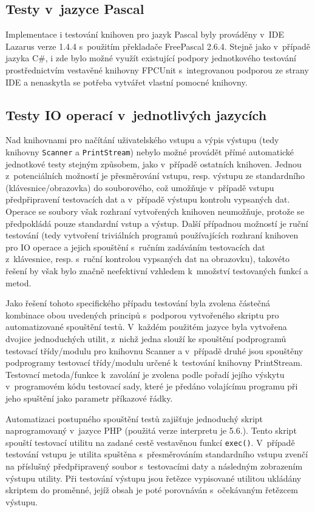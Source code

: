 \documentclass[czech,BP]{thesiskiv}
\begin{document}
\subsection{Testy v~jazyce Pascal}
Implementace i testování knihoven pro jazyk Pascal byly prováděny v~IDE Lazarus verze 1.4.4 s~použitím překladače FreePascal 2.6.4. Stejně jako v~případě jazyka C\#, i zde bylo možné využít existující podpory jednotkového testování prostřednictvím vestavěné knihovny FPCUnit s~integrovanou podporou ze strany IDE a nenaskytla se potřeba vytvářet vlastní pomocné knihovny.

\subsection{Testy IO operací v~jednotlivých jazycích}
Nad knihovnami pro načítání uživatelského vstupu a výpis výstupu (tedy knihovny \texttt{Scanner} a \texttt{PrintStream}) nebylo možné provádět přímé automatické jednotkové testy stejným způsobem, jako v~případě ostatních knihoven. Jednou z~potenciálních možností je přesměrování vstupu, resp. výstupu ze standardního (klávesnice/obrazovka) do souborového, což umožňuje v~případě vstupu předpřipravení testovacích dat a v~případě výstupu kontrolu vypsaných dat. Operace se soubory však rozhraní vytvořených knihoven neumožňuje, protože se předpokládá pouze standardní vstup a výstup. Další případnou možností je ruční testování (tedy vytvoření triviálních programů používajících rozhraní knihoven pro IO operace a jejich spouštění s~ručním zadáváním testovacích dat z~klávesnice, resp. s~ruční kontrolou vypsaných dat na obrazovku), takovéto řešení by však bylo značně neefektivní vzhledem k~množství testovaných funkcí a metod.\par
Jako řešení tohoto specifického případu testování byla zvolena částečná kombinace obou uvedených principů s~podporou vytvořeného skriptu pro automatizované spouštění testů. V~každém použitém jazyce byla vytvořena dvojice jednoduchých utilit, z~nichž jedna slouží ke spouštění podprogramů testovací třídy/modulu pro knihovnu Scanner a v~případě druhé jsou spouštěny podprogramy testovací třídy/modulu určené k~testování knihovny PrintStream. Testovací metoda/funkce k~zavolání je zvolena podle pořadí jejího výskytu v~programovém kódu testovací sady, které je předáno volajícímu programu při jeho spuštění jako parametr příkazové řádky.\par
Automatizaci postupného spouštění testů zajišťuje jednoduchý skript naprogramovaný v~jazyce PHP (použitá verze interpretu je 5.6.). Tento skript spouští testovací utilitu na zadané cestě vestavěnou funkcí \texttt{exec()}. V~případě testování vstupu je utilita spuštěna s~přesměrováním standardního vstupu zvenčí na příslušný předpřipravený soubor s~testovacími daty a následným zobrazením výstupu utility. Při testování výstupu jsou řetězce vypisované utilitou ukládány skriptem do proměnné, jejíž obsah je poté porovnáván s~očekávaným řetězcem výstupu.
\end{document}
